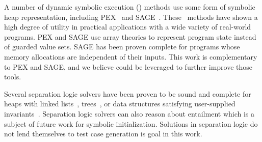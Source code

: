 
A number of dynamic symbolic execution (\dsetxt{}) methods use some form 
of symbolic heap representation, including PEX~\cite{Tillmann:2008} and SAGE~\cite{Elkarablieh:2009}. These~\dsetxt{} methods have shown a high degree of utility in practical applications with a wide variety of real-world programs. PEX and SAGE use array theories to represent program state instead of guarded value sets.
SAGE has been proven complete for programs whose memory allocations are independent of their inputs. This work is complementary to PEX and SAGE, and we believe could be leveraged to further improve those tools. 

Several separation logic solvers have been proven to be sound and complete for heaps with linked lists~\cite{Navarro:2011,Cook:2011,Berdine:2005}, trees~\cite{Piskac:2014}, or data structures satisfying user-supplied invariants~\cite{Brotherston:2014}. Separation logic solvers can also reason about entailment which is a subject of future work for symbolic initialization. Solutions in separation logic do not lend themselves to test case generation is  goal in this work. 


%
%
%

%
%
%
%
%
